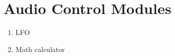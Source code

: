 \section{Audio Control Modules}
\begin{enumerate}
	\item LFO
	\item Math calculator
\end{enumerate}
